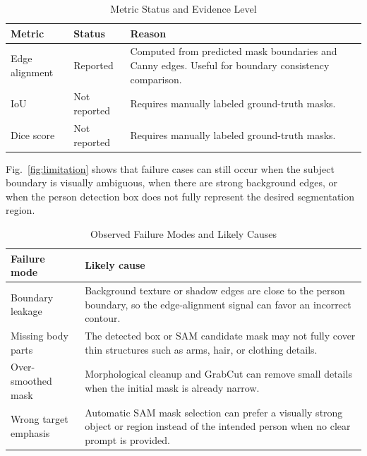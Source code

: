 \documentclass[conference]{IEEEtran}
\begin{document}
\begin{table}[htbp]
\caption{Metric Status and Evidence Level}
\begin{center}
\small
\setlength{\tabcolsep}{3pt}
\renewcommand{\arraystretch}{1.15}
\begin{tabular}{|L{1.7cm}|L{1.55cm}|L{3.35cm}|}
\hline
\textbf{Metric} & \textbf{Status} & \textbf{Reason} \\
\hline
Edge alignment & Reported & Computed from predicted mask boundaries and Canny edges. Useful for boundary consistency comparison. \\
\hline
IoU & Not reported & Requires manually labeled ground-truth masks. \\
\hline
Dice score & Not reported & Requires manually labeled ground-truth masks. \\
\hline
\end{tabular}
\label{tab:metric_status}
\end{center}
\end{table}

Fig.~\ref{fig:limitation} shows that failure cases can still occur when the subject boundary is visually ambiguous, when there are strong background edges, or when the person detection box does not fully represent the desired segmentation region.

\begin{table}[htbp]
\caption{Observed Failure Modes and Likely Causes}
\begin{center}
\small
\setlength{\tabcolsep}{3pt}
\renewcommand{\arraystretch}{1.15}
\begin{tabular}{|L{2.05cm}|L{4.65cm}|}
\hline
\textbf{Failure mode} & \textbf{Likely cause} \\
\hline
Boundary leakage & Background texture or shadow edges are close to the person boundary, so the edge-alignment signal can favor an incorrect contour. \\
\hline
Missing body parts & The detected box or SAM candidate mask may not fully cover thin structures such as arms, hair, or clothing details. \\
\hline
Over-smoothed mask & Morphological cleanup and GrabCut can remove small details when the initial mask is already narrow. \\
\hline
Wrong target emphasis & Automatic SAM mask selection can prefer a visually strong object or region instead of the intended person when no clear prompt is provided. \\
\hline
\end{tabular}
\label{tab:failure_modes}
\end{center}
\end{table}
\end{document}
